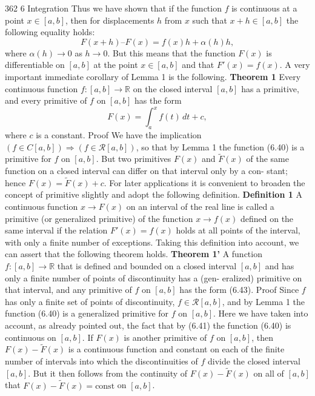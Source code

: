 362
6 Integration
\medskip
Thus we have shown that if the function $f$ is continuous at a point $x \in [a, b]$, then
for displacements $h$ from $x$ such that $x + h \in [a, b]$ the following equality holds:
\[
F(x + h) – F(x) = f (x)h + \alpha(h)h,
\tag{6.42}
\]
where $\alpha(h) \to 0$ as $h \to 0$.
\medskip
But this means that the function $F(x)$ is differentiable on $[a, b]$ at the point $x \in
[a, b]$ and that $F'(x) = f(x)$.
\medskip
A very important immediate corollary of Lemma 1 is the following.
\medskip
\noindent \textbf{Theorem 1} Every continuous function $f : [a, b] \to \mathbb{R}$ on the closed interval $[a, b]$
has a primitive, and every primitive of $f$ on $[a, b]$ has the form
\[
F(x) = \int_a^x f(t)\,dt + c,
\tag{6.43}
\]
where $c$ is a constant.
\medskip
Proof We have the implication $(f \in C[a, b]) \Rightarrow (f \in \mathcal{R}[a, b])$, so that by Lemma 1
the function (6.40) is a primitive for $f$ on $[a, b]$. But two primitives $F(x)$ and $\tilde{F}(x)$
of the same function on a closed interval can differ on that interval only by a con-
stant; hence $F(x) = \tilde{F}(x) + c$.
\medskip
For later applications it is convenient to broaden the concept of primitive slightly
and adopt the following definition.
\medskip
\noindent \textbf{Definition 1} A continuous function $x \to F(x)$ on an interval of the real line is
called a primitive (or generalized primitive) of the function $x \to f(x)$ defined on
the same interval if the relation $F'(x) = f(x)$ holds at all points of the interval, with
only a finite number of exceptions.
\medskip
Taking this definition into account, we can assert that the following theorem
holds.
\medskip
\noindent \textbf{Theorem 1'} A function $f : [a, b] \to \mathbb{R}$ that is defined and bounded on a closed
interval $[a, b]$ and has only a finite number of points of discontinuity has a (gen-
eralized) primitive on that interval, and any primitive of $f$ on $[a,b]$ has the form
(6.43).
\medskip
Proof Since $f$ has only a finite set of points of discontinuity, $f \in \mathcal{R}[a, b]$, and by
Lemma 1 the function (6.40) is a generalized primitive for $f$ on $[a, b]$. Here we have
taken into account, as already pointed out, the fact that by (6.41) the function (6.40)
is continuous on $[a, b]$. If $F(x)$ is another primitive of $f$ on $[a, b]$, then $F(x) - \tilde{F}(x)$
is a continuous function and constant on each of the finite number of intervals into
which the discontinuities of $f$ divide the closed interval $[a, b]$. But it then follows
from the continuity of $F(x) - \tilde{F}(x)$ on all of $[a, b]$ that $F(x) - \tilde{F}(x) = \text{const}$ on
$[a, b]$.